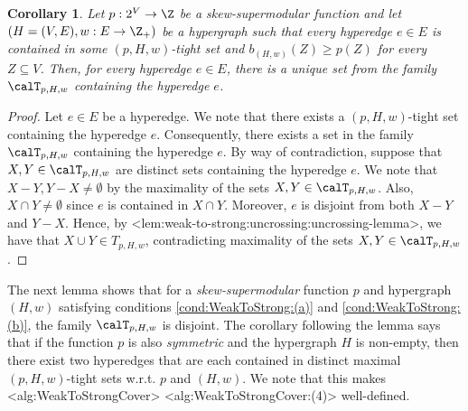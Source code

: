 \documentclass{article}
\def\Cref#1{<#1>}%
\newtheorem{corollary}{Corollary}[section]
\newtheorem{definition}{Definition}[section]
\newcommand{\maximalTightSetFamily}[1]{\ensuremath{\calT_{#1}}\xspace}
\newcommand{\tightSetFamily}[1]{\ensuremath{T_{#1}}\xspace}
\newcommand{\maximalTightSetContainingHyperedge}[1]{\ensuremath{\tau_{#1}}\xspace}
\begin{document}
\begin{corollary}\label{cor:weak-to-strong:uncrossing:maximal-tight-set-containing-hyperedge-unique}
Let $p:2^V\rightarrow\Z$ be a skew-supermodular function and let $\left(H = (V, E), w:E \rightarrow\Z_+\right)$ be a hypergraph such that  
every hyperedge $e \in E$ is contained in some $(p, H, w)$-tight set
and $b_{(H,w)}(Z) \geq p(Z)$ for every $Z \subseteq V$. 
Then, for every hyperedge $e \in E$, there is a unique set from the family $\maximalTightSetFamily{p, H, w}$ containing the hyperedge $e$.
\end{corollary}
\begin{proof}
    Let $e \in E$ be a hyperedge. We note that there exists a $(p, H, w)$-tight set containing the hyperedge $e$. Consequently, there exists a set in the family \maximalTightSetFamily{p, H, w} containing the hyperedge $e$. By way of contradiction, suppose that $X, Y \in \maximalTightSetFamily{p, H, w}$ are distinct sets containing the hyperedge $e$. We note that $X - Y, Y - X \not = \emptyset$ by the maximality of the sets $X, Y \in \maximalTightSetFamily{p, H, w}$.
    Also, $X\cap Y\neq \emptyset$ since $e$ is contained in $X\cap Y$. Moreover, $e$ is disjoint from both $X-Y$ and $Y-X$. Hence, by \Cref{lem:weak-to-strong:uncrossing:uncrossing-lemma}, we have that $X\cup Y \in \tightSetFamily{p, H, w}$, contradicting maximality of the sets $X, Y \in \maximalTightSetFamily{p, H, w}$.
\end{proof}

The next lemma shows that for a \emph{skew-supermodular} function $p$ and hypergraph $(H, w)$ satisfying conditions  \ref{cond:WeakToStrong:(a)} and \ref{cond:WeakToStrong:(b)}, the family $\maximalTightSetFamily{p, H, w}$ is disjoint. The corollary following the lemma says that if the function $p$ is also \emph{symmetric} and the hypergraph $H$ is non-empty, then there exist two hyperedges that are each contained in distinct maximal $(p, H, w)$-tight sets w.r.t. $p$ and $(H, w)$.  We note that this makes \Cref{alg:WeakToStrongCover} \Cref{alg:WeakToStrongCover:(4)} well-defined.
\end{document}
